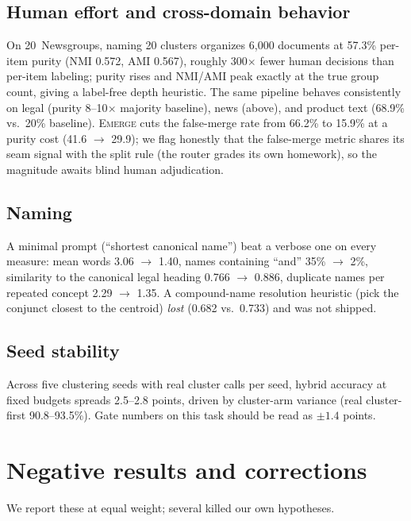 \documentclass[11pt]{article}
\begin{document}
\subsection{Human effort and cross-domain behavior}
On 20~Newsgroups, naming 20 clusters organizes 6{,}000 documents at 57.3\% per-item purity (NMI 0.572, AMI 0.567), roughly 300$\times$ fewer human decisions than per-item labeling; purity rises and NMI/AMI peak exactly at the true group count, giving a label-free depth heuristic. The same pipeline behaves consistently on legal (purity 8--10$\times$ majority baseline), news (above), and product text (68.9\% vs.\ 20\% baseline). \textsc{Emerge} cuts the false-merge rate from 66.2\% to 15.9\% at a purity cost (41.6 $\rightarrow$ 29.9); we flag honestly that the false-merge metric shares its seam signal with the split rule (the router grades its own homework), so the magnitude awaits blind human adjudication.

\subsection{Naming}
A minimal prompt (``shortest canonical name'') beat a verbose one on every measure: mean words 3.06 $\rightarrow$ 1.40, names containing ``and'' 35\% $\rightarrow$ 2\%, similarity to the canonical legal heading 0.766 $\rightarrow$ 0.886, duplicate names per repeated concept 2.29 $\rightarrow$ 1.35. A compound-name resolution heuristic (pick the conjunct closest to the centroid) \emph{lost} (0.682 vs.\ 0.733) and was not shipped.

\subsection{Seed stability}\label{sec:seeds}
Across five clustering seeds with real cluster calls per seed, hybrid accuracy at fixed budgets spreads 2.5--2.8 points, driven by cluster-arm variance (real cluster-first 90.8--93.5\%). Gate numbers on this task should be read as $\pm 1.4$ points.

\section{Negative results and corrections}\label{sec:negative}

We report these at equal weight; several killed our own hypotheses.
\end{document}
